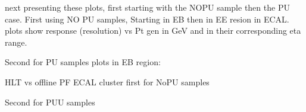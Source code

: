 
next presenting these plots, first starting with the NOPU sample then the PU case.
First using NO PU samples, Starting in EB then in EE resion in ECAL. plots show response (resolution) vs Pt gen in GeV and in their corresponding eta range.





Second for PU samples plots in EB region:






HLT vs offline PF ECAL cluster
first for NoPU samples

Second for PUU samples



